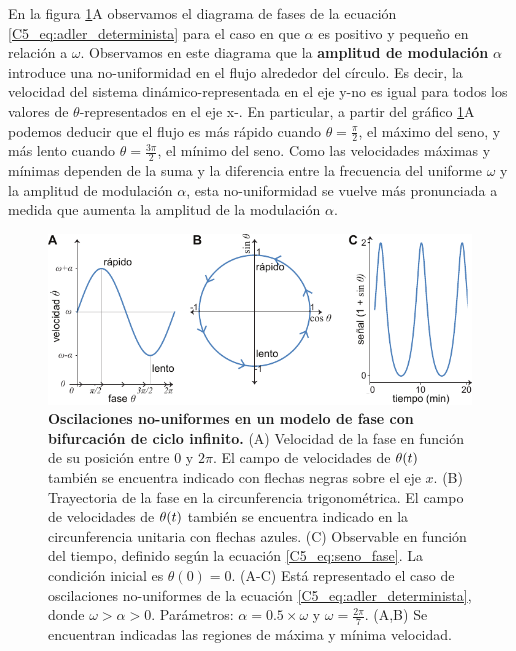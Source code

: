 \documentclass[./main.tex]{subfiles}
\begin{document}
En la figura \ref{C5_fig:adler_determinista_oscilatorio}A observamos el diagrama de fases de la ecuación \ref{C5_eq:adler_determinista} para el caso en que $\alpha$ es positivo y pequeño en relación a $\omega$. Observamos en este diagrama que la \textbf{amplitud de modulación} $\alpha$ introduce una no-uniformidad en el flujo alrededor del círculo. Es decir, la velocidad del sistema dinámico-representada en el eje y-no es igual para todos los valores de $\theta$-representados en el eje x-. En particular, a partir del gráfico \ref{C5_fig:adler_determinista_oscilatorio}A podemos deducir que el flujo es más rápido cuando $\theta = \frac{\pi}{2}$, el máximo del seno, y más lento cuando $\theta = \frac{3 \pi}{2}$, el mínimo del seno. Como las velocidades máximas y mínimas dependen de la suma y la diferencia entre la frecuencia del uniforme $\omega$ y la amplitud de modulación $\alpha$, esta no-uniformidad se vuelve más pronunciada a medida que aumenta la amplitud de la modulación $\alpha$. 


\begin{figure}
    \centering
    \includegraphics[width=1\columnwidth]{figures/chapter5/C5_determinista_oscilatorio.pdf} 
    \caption{\textbf{Oscilaciones no-uniformes en un modelo de fase con bifurcación de ciclo infinito.} (A) Velocidad de la fase en función de su posición entre $0$ y $2\pi$. El campo de velocidades de $\theta(t)$ también se encuentra indicado con flechas negras sobre el eje $x$. (B) Trayectoria de la fase en la circunferencia trigonométrica. El campo de velocidades de $\theta(t)$ también se encuentra indicado en la circunferencia unitaria con flechas azules. (C) Observable en función del tiempo, definido según la ecuación \ref{C5_eq:seno_fase}. La condición inicial es $\theta(0)= 0$. (A-C) Está representado el caso de oscilaciones no-uniformes de la ecuación \ref{C5_eq:adler_determinista}, donde $\omega > \alpha > 0$. Parámetros: $\alpha = 0.5 \times \omega$ y $\omega = \frac{2 \pi}{7}$. (A,B) Se encuentran indicadas las regiones de máxima y mínima velocidad.}
    \label{C5_fig:adler_determinista_oscilatorio}
\end{figure}
\end{document}
